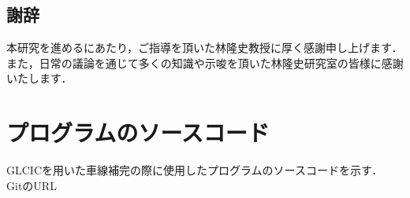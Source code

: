 \documentclass[a4j, 11pt]{jreport}
\begin{document}


\newpage
\section*{謝辞}
本研究を進めるにあたり，ご指導を頂いた林隆史教授に厚く感謝申し上げます．
また，日常の議論を通じて多くの知識や示唆を頂いた林隆史研究室の皆様に感謝いたします．

\appendix
\chapter{プログラムのソースコード}
GLCICを用いた車線補完の際に使用したプログラムのソースコードを示す．\\
GitのURL
\end{document}
